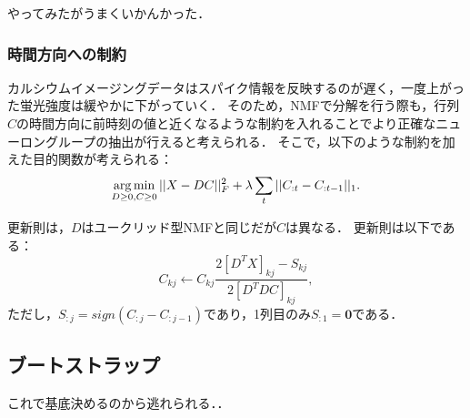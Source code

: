 やってみたがうまくいかんかった．

\subsubsection{時間方向への制約}
カルシウムイメージングデータはスパイク情報を反映するのが遅く，一度上がった蛍光強度は緩やかに下がっていく．
そのため，NMFで分解を行う際も，行列$C$の時間方向に前時刻の値と近くなるような制約を入れることでより正確なニューロングループの抽出が行えると考えられる．
そこで，以下のような制約を加えた目的関数が考えられる：
\begin{equation}
	\operatorname*{arg\,min}_{D \geq 0, C \geq 0}||X - DC||^2_F + \lambda \sum_t||C_{:t} - C_{:t-1}||_1.
  \label{eq:NMF-ar}
\end{equation}

更新則は，$D$はユークリッド型NMFと同じだが$C$は異なる．
更新則は以下である：
\begin{equation}
	C_{kj} \leftarrow C_{kj} \frac{2[D^T X]_{kj} - S_{kj}}{2[D^T DC]_{kj}},
\end{equation}
ただし，$S_{:j} = sign(C_{:j} - C_{:j-1})$であり，1列目のみ$S_{:1} = \mathbf{0}$である．

\subsection{ブートストラップ}
これで基底決めるのから逃れられる．．
